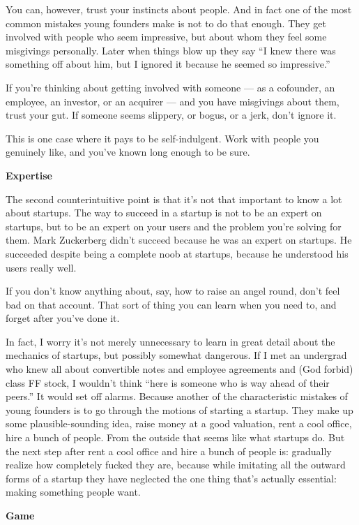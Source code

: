 \documentclass[12pt]{book}
\begin{document}
You can, however, trust your instincts about people. And in fact one of
the most common mistakes young founders make is not to do that enough.
They get involved with people who seem impressive, but about whom they
feel some misgivings personally. Later when things blow up they say ``I
knew there was something off about him, but I ignored it because he
seemed so impressive.''

If you're thinking about getting involved with someone --- as a
cofounder, an employee, an investor, or an acquirer --- and you have
misgivings about them, trust your gut. If someone seems slippery, or
bogus, or a jerk, don't ignore it.

This is one case where it pays to be self-indulgent. Work with people
you genuinely like, and you've known long enough to be sure.

\textbf{Expertise}

The second counterintuitive point is that it's not that important to
know a lot about startups. The way to succeed in a startup is not to be
an expert on startups, but to be an expert on your users and the problem
you're solving for them. Mark Zuckerberg didn't succeed because he was
an expert on startups. He succeeded despite being a complete noob at
startups, because he understood his users really well.

If you don't know anything about, say, how to raise an angel round,
don't feel bad on that account. That sort of thing you can learn when
you need to, and forget after you've done it.

In fact, I worry it's not merely unnecessary to learn in great detail
about the mechanics of startups, but possibly somewhat dangerous. If I
met an undergrad who knew all about convertible notes and employee
agreements and (God forbid) class FF stock, I wouldn't think ``here is
someone who is way ahead of their peers.'' It would set off alarms.
Because another of the characteristic mistakes of young founders is to
go through the motions of starting a startup. They make up some
plausible-sounding idea, raise money at a good valuation, rent a cool
office, hire a bunch of people. From the outside that seems like what
startups do. But the next step after rent a cool office and hire a bunch
of people is: gradually realize how completely fucked they are, because
while imitating all the outward forms of a startup they have neglected
the one thing that's actually essential: making something people want.

\textbf{Game}
\end{document}
